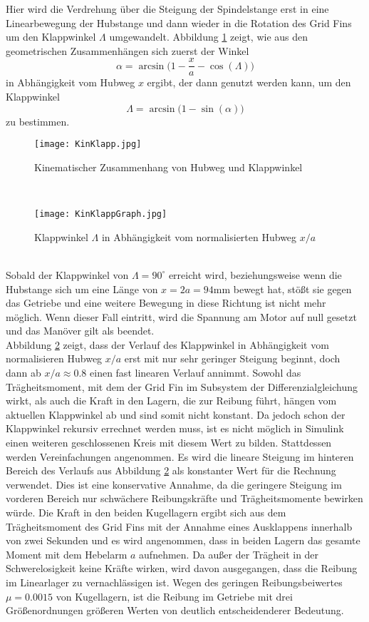 Hier wird die Verdrehung über die Steigung der Spindelstange erst in eine Linearbewegung der Hubstange und dann wieder in die Rotation des Grid Fins um den Klappwinkel $\Lambda$ umgewandelt. Abbildung \ref{abb_kinklapp} zeigt, wie aus den geometrischen Zusammenhängen sich zuerst der Winkel
\begin{equation}
	\alpha=\arcsin\bigg(1-\frac{x}{a}-\cos(\Lambda)\bigg)
\end{equation}
in Abhängigkeit vom Hubweg $x$ ergibt, der dann genutzt werden kann, um den Klappwinkel
\begin{equation}
	\Lambda = \arcsin\bigg(1-\sin(\alpha)\bigg)
\end{equation}
zu bestimmen.
\begin{figure}[h] 
	\centering
	\texttt{[image: KinKlapp.jpg]}
	\caption{Kinematischer Zusammenhang von Hubweg und Klappwinkel}
	\label{abb_kinklapp}
\end{figure}\\
\begin{figure}[h] 
	\centering
	\texttt{[image: KinKlappGraph.jpg]}
	\caption{Klappwinkel $\Lambda$ in Abhängigkeit vom normalisierten Hubweg $x/a$}
	\label{abb_KinKlappGraph}
\end{figure}\\	
Sobald der Klappwinkel von $\Lambda = 90^\circ$ erreicht wird, beziehungsweise wenn die Hubstange sich um eine Länge von $x = 2a = 94$mm bewegt hat, stößt sie gegen das Getriebe und eine weitere Bewegung in diese Richtung ist nicht mehr möglich. Wenn dieser Fall eintritt, wird die Spannung am Motor auf null gesetzt und das Manöver gilt als beendet.
\\
Abbildung \ref{abb_KinKlappGraph} zeigt, dass der Verlauf des Klappwinkel in Abhängigkeit vom normalisieren Hubweg $x/a$ erst mit nur sehr geringer Steigung beginnt, doch dann ab $x/a \approx 0.8$ einen fast linearen Verlauf annimmt. Sowohl das Trägheitsmoment, mit dem der Grid Fin im Subsystem der Differenzialgleichung wirkt, als auch die Kraft in den Lagern, die zur Reibung führt, hängen vom aktuellen Klappwinkel ab und sind somit nicht konstant. Da jedoch schon der Klappwinkel rekursiv errechnet werden muss, ist es nicht möglich in Simulink einen weiteren geschlossenen Kreis mit diesem Wert zu bilden. Stattdessen werden Vereinfachungen angenommen. Es wird die lineare Steigung im hinteren Bereich des Verlaufs aus Abbildung \ref{abb_KinKlappGraph} als konstanter Wert für die Rechnung verwendet. Dies ist eine konservative Annahme, da die geringere Steigung im vorderen Bereich nur schwächere Reibungskräfte und Trägheitsmomente bewirken würde. Die Kraft in den beiden Kugellagern ergibt sich aus dem Trägheitsmoment des Grid Fins mit der Annahme eines Ausklappens innerhalb von zwei Sekunden und es wird angenommen, dass in beiden Lagern das gesamte Moment mit dem Hebelarm $a$ aufnehmen. Da außer der Trägheit in der Schwerelosigkeit keine Kräfte wirken, wird davon ausgegangen, dass die Reibung im Linearlager zu vernachlässigen ist. Wegen des geringen Reibungsbeiwertes $\mu = 0.0015$ \cite{lagerreibung} von Kugellagern, ist die Reibung im Getriebe mit drei Größenordnungen größeren Werten von deutlich entscheidenderer Bedeutung.
